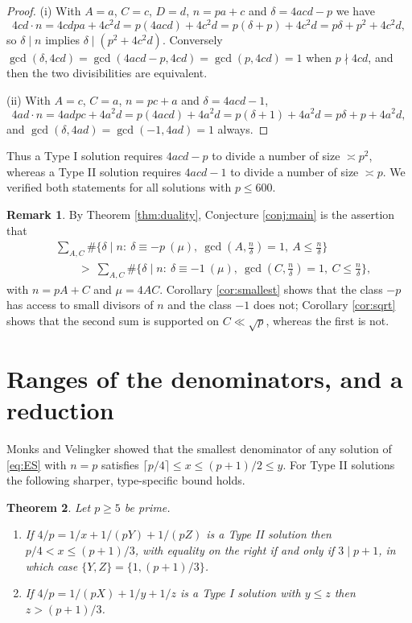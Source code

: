 \documentclass[11pt,reqno]{amsart}
\theoremstyle{plain}
\newtheorem{theorem}{Theorem}[section]
\theoremstyle{definition}
\newtheorem{remark}[theorem]{Remark}
\numberwithin{equation}{section}
\begin{document}
\begin{proof}
(i) With $A=a$, $C=c$, $D=d$, $n=pa+c$ and $\delta=4acd-p$ we have
\[
  4cd\cdot n=4cdpa+4c^{2}d=p(4acd)+4c^{2}d=p(\delta+p)+4c^{2}d
  =p\delta+p^{2}+4c^{2}d,
\]
so $\delta\mid n$ implies $\delta\mid(p^{2}+4c^{2}d)$. Conversely
$\gcd(\delta,4cd)=\gcd(4acd-p,4cd)=\gcd(p,4cd)=1$ when $p\nmid4cd$, and then the two
divisibilities are equivalent.

(ii) With $A=c$, $C=a$, $n=pc+a$ and $\delta=4acd-1$,
\[
  4ad\cdot n=4adpc+4a^{2}d=p(4acd)+4a^{2}d=p(\delta+1)+4a^{2}d=p\delta+p+4a^{2}d,
\]
and $\gcd(\delta,4ad)=\gcd(-1,4ad)=1$ always.
\end{proof}

Thus a Type I solution requires $4acd-p$ to divide a number of size $\asymp p^{2}$,
whereas a Type II solution requires $4acd-1$ to divide a number of size
$\asymp p$. We verified both statements for all solutions with $p\le600$.

\begin{remark}\label{rem:dualconj}
By Theorem \ref{thm:duality}, Conjecture \ref{conj:main} is the assertion that
\begin{align*}
  &\sum_{A,C}\#\bigl\{\delta\mid n:\ \delta\equiv-p\ (\mu),\ \gcd(A,\tfrac n\delta)=1,\
    A\le\tfrac n\delta\bigr\}\\
  &\qquad>\ \sum_{A,C}\#\bigl\{\delta\mid n:\ \delta\equiv-1\ (\mu),\ \gcd(C,\tfrac n\delta)=1,\
    C\le\tfrac n\delta\bigr\},
\end{align*}
with $n=pA+C$ and $\mu=4AC$. Corollary \ref{cor:smallest} shows that the class $-p$ has
access to small divisors of $n$ and the class $-1$ does not; Corollary \ref{cor:sqrt}
shows that the second sum is supported on $C\ll\sqrt p$, whereas the first is not.
\end{remark}

\section{Ranges of the denominators, and a reduction}\label{sec:ranges}

Monks and Velingker \cite[Thm.~2.1(i)]{MonksVelingker} showed that the smallest
denominator of any solution of \eqref{eq:ES} with $n=p$ satisfies
$\lceil p/4\rceil\le x\le(p+1)/2\le y$. For
Type II solutions the following sharper, type-specific bound holds.

\begin{theorem}\label{thm:ranges}
Let $p\ge5$ be prime.
\begin{enumerate}
\item[(i)] If $4/p=1/x+1/(pY)+1/(pZ)$ is a Type II solution then $p/4<x\le(p+1)/3$,
with equality on the right if and only if $3\mid p+1$, in which case
$\{Y,Z\}=\{1,(p+1)/3\}$.
\item[(ii)] If $4/p=1/(pX)+1/y+1/z$ is a Type I solution with $y\le z$ then
$z>(p+1)/3$.
\end{enumerate}
\end{theorem}
\end{document}
